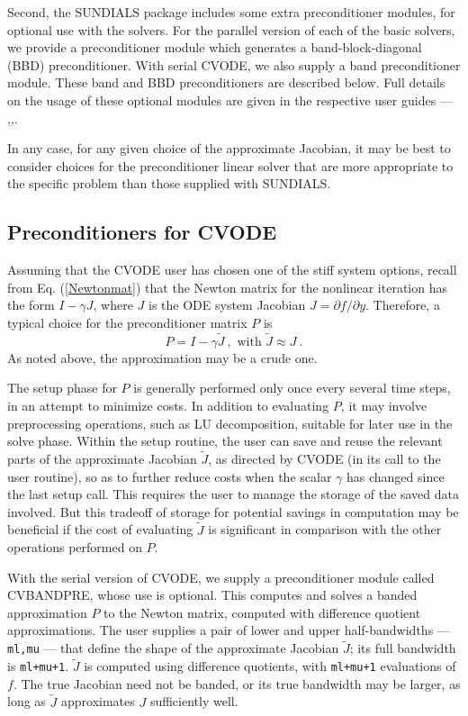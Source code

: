 Second, the SUNDIALS package includes some extra preconditioner
modules, for optional use with the solvers.  For the parallel version
of each of the basic solvers, we provide a preconditioner module which
generates a band-block-diagonal (BBD) preconditioner.  With serial
CVODE, we also supply a band preconditioner module.  These band and
BBD preconditioners are described below.  Full details on the usage
of these optional modules are given in the respective user guides
--- \cite{ByHi:98},\cite{TaHi:98},\cite{HiTa:99}.

In any case, for any given choice of the approximate Jacobian, it may
be best to consider choices for the preconditioner linear solver that
are more appropriate to the specific problem than those supplied with
SUNDIALS.

\subsection{Preconditioners for CVODE}

Assuming that the CVODE user has chosen one of the stiff system
options, recall from Eq. (\ref{Newtonmat}) that the Newton matrix for
the nonlinear iteration has the form $I - \gamma J$, where $J$ is the
ODE system Jacobian $J = \partial f / \partial y$.  Therefore, a
typical choice for the preconditioner matrix $P$ is
\[ P = I - \gamma \tilde{J} ~, \mbox{ with } \tilde{J} \approx J ~. \]
As noted above, the approximation may be a crude one.  

The setup phase for $P$ is generally performed only once every several
time steps, in an attempt to minimize costs.  In addition to
evaluating $P$, it may involve preprocessing operations, such as LU
decomposition, suitable for later use in the solve phase.  Within the
setup routine, the user can save and reuse the relevant parts of the
approximate Jacobian $\tilde{J}$, as directed by CVODE (in its call to
the user routine), so as to further reduce costs when the scalar
$\gamma$ has changed since the last setup call.  This requires the
user to manage the storage of the saved data involved.  But this
tradeoff of storage for potential savings in computation may be
beneficial if the cost of evaluating $\tilde{J}$ is significant in
comparison with the other operations performed on $P$.

With the serial version of CVODE, we supply a preconditioner module
called CVBANDPRE, whose use is optional.  This computes and solves a
banded approximation $P$ to the Newton matrix, computed with
difference quotient approximations.  The user supplies a pair of lower
and upper half-bandwidths --- {\tt ml,mu} --- that define the shape of
the approximate Jacobian $\tilde{J}$; its full bandwidth is
{\tt ml+mu+1}.  $\tilde{J}$ is computed using difference quotients,
with {\tt ml+mu+1} evaluations of $f$.  The true Jacobian need not be
banded, or its true bandwidth may be larger, as long as $\tilde{J}$
approximates $J$ sufficiently well.

